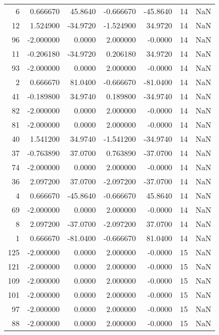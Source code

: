 \begin{tabular}{rrrrrrr}
  6 &  0.666670 &  45.8640 & -0.666670 &    -45.8640 &          14 & NaN \\
 12 &  1.524900 & -34.9720 & -1.524900 &     34.9720 &          14 & NaN \\
 96 & -2.000000 &   0.0000 &  2.000000 &     -0.0000 &          14 & NaN \\
 11 & -0.206180 & -34.9720 &  0.206180 &     34.9720 &          14 & NaN \\
 93 & -2.000000 &   0.0000 &  2.000000 &     -0.0000 &          14 & NaN \\
  2 &  0.666670 &  81.0400 & -0.666670 &    -81.0400 &          14 & NaN \\
 41 & -0.189800 &  34.9740 &  0.189800 &    -34.9740 &          14 & NaN \\
 82 & -2.000000 &   0.0000 &  2.000000 &     -0.0000 &          14 & NaN \\
 81 & -2.000000 &   0.0000 &  2.000000 &     -0.0000 &          14 & NaN \\
 40 &  1.541200 &  34.9740 & -1.541200 &    -34.9740 &          14 & NaN \\
 37 & -0.763890 &  37.0700 &  0.763890 &    -37.0700 &          14 & NaN \\
 74 & -2.000000 &   0.0000 &  2.000000 &     -0.0000 &          14 & NaN \\
 36 &  2.097200 &  37.0700 & -2.097200 &    -37.0700 &          14 & NaN \\
  4 &  0.666670 & -45.8640 & -0.666670 &     45.8640 &          14 & NaN \\
 69 & -2.000000 &   0.0000 &  2.000000 &     -0.0000 &          14 & NaN \\
  8 &  2.097200 & -37.0700 & -2.097200 &     37.0700 &          14 & NaN \\
  1 &  0.666670 & -81.0400 & -0.666670 &     81.0400 &          14 & NaN \\
125 & -2.000000 &   0.0000 &  2.000000 &     -0.0000 &          15 & NaN \\
121 & -2.000000 &   0.0000 &  2.000000 &     -0.0000 &          15 & NaN \\
109 & -2.000000 &   0.0000 &  2.000000 &     -0.0000 &          15 & NaN \\
101 & -2.000000 &   0.0000 &  2.000000 &     -0.0000 &          15 & NaN \\
 97 & -2.000000 &   0.0000 &  2.000000 &     -0.0000 &          15 & NaN \\
 88 & -2.000000 &   0.0000 &  2.000000 &     -0.0000 &          15 & NaN \\

\end{tabular}
